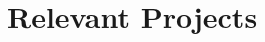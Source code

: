 \documentclass[a4paper,11pt]{article}
\begin{document}
\color{BlueViolet}
\section{Relevant Projects}
\color{black}

\end{document}
